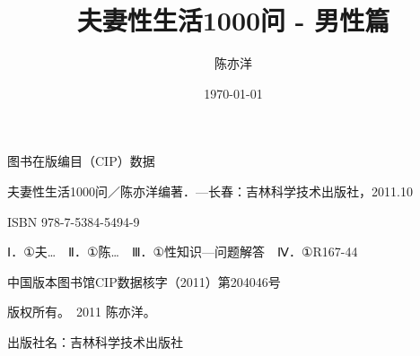 \usepackage{array}
\usepackage{longtable}
\usepackage{booktabs}
\usepackage{multirow}
\usepackage{makecell}

\usepackage{amsmath}
\usepackage{amssymb}
\usepackage{mathtools}

\usepackage{hyperref}
\usepackage{bookmark}

\usepackage{fancyhdr}
\pagestyle{fancy}
\fancyhf{}
\fancyhead[LE,RO]{\thepage}
\fancyhead[LO]{\song\leftmark}
\fancyhead[RE]{\song\rightmark}
\renewcommand{\headrulewidth}{0.4pt}
\renewcommand{\footrulewidth}{0pt}

\usepackage{wasysym}

\usepackage{datetime}

\usepackage{calc}
\usepackage{ifthen}
\usepackage{afterpage}
\usepackage{pdfpages}

\title{\hei{} 夫妻性生活1000问 - 男性篇}
\author{陈亦洋}
\date{\today}



\maketitle

\newpage
\thispagestyle{empty}
\begin{center}
    \vspace*{8cm}
    \song{} 图书在版编目（CIP）数据\par
    \vspace{0.5em}
    \song{} 夫妻性生活1000问／陈亦洋编著．—长春：吉林科学技术出版社，2011.10\par
    \vspace{0.5em}
    \song{} ISBN 978-7-5384-5494-9\par
    \vspace{0.5em}
    \song{} Ⅰ．①夫…　Ⅱ．①陈…　Ⅲ．①性知识—问题解答　Ⅳ．①R167-44\par
    \vspace{0.5em}
    \song{} 中国版本图书馆CIP数据核字（2011）第204046号\par
    \vspace{2em}
    \song{} 版权所有。\textcopyright\ 2011 陈亦洋。\par
    \vspace{0.5em}
    \song{} 出版社名：吉林科学技术出版社\par
\end{center}

